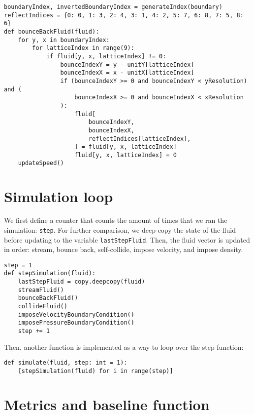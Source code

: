\begin{verbatim}
boundaryIndex, invertedBoundaryIndex = generateIndex(boundary)
reflectIndices = {0: 0, 1: 3, 2: 4, 3: 1, 4: 2, 5: 7, 6: 8, 7: 5, 8: 6}
def bounceBackFluid(fluid):
    for y, x in boundaryIndex:
        for latticeIndex in range(9):
            if fluid[y, x, latticeIndex] != 0:
                bounceIndexY = y - unitY[latticeIndex]
                bounceIndexX = x - unitX[latticeIndex]
                if (bounceIndexY >= 0 and bounceIndexY < yResolution) and (
                    bounceIndexX >= 0 and bounceIndexX < xResolution
                ):
                    fluid[
                        bounceIndexY,
                        bounceIndexX,
                        reflectIndices[latticeIndex],
                    ] = fluid[y, x, latticeIndex]
                    fluid[y, x, latticeIndex] = 0
    updateSpeed()
\end{verbatim}

\section{Simulation loop}

We first define a counter that counts the amount of times that we ran the simulation: \texttt{step}. For further comparison, we deep-copy the state of the fluid before updating to the variable \texttt{lastStepFluid}. Then, the fluid vector is updated in order: stream, bounce back, self-collide, impose velocity, and impose density.
\begin{verbatim}
step = 1
def stepSimulation(fluid):
    lastStepFluid = copy.deepcopy(fluid)
    streamFluid()
    bounceBackFluid()
    collideFluid()
    imposeVelocityBoundaryCondition()
    imposePressureBoundaryCondition()
    step += 1
\end{verbatim}

Then, another function is implemented as a way to loop over the step function:
\begin{verbatim}
def simulate(fluid, step: int = 1):
    [stepSimulation(fluid) for i in range(step)]
\end{verbatim}

\section{Metrics and baseline function}

